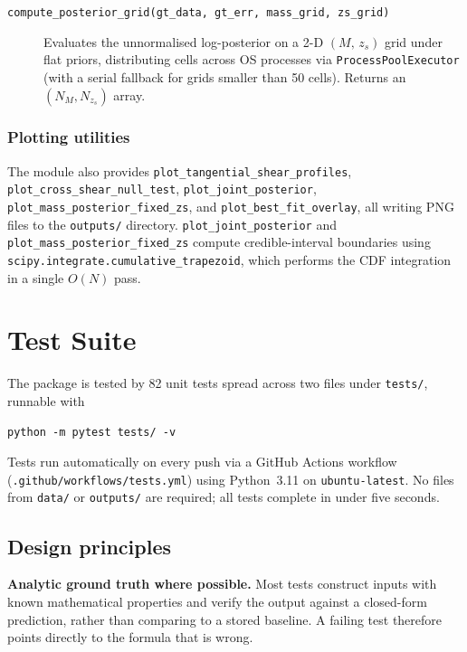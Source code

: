 \begin{description}
  \item[\texttt{compute\_posterior\_grid(gt\_data, gt\_err, mass\_grid,
        zs\_grid)}]
    Evaluates the unnormalised log-posterior on a 2-D $(M,\,z_s)$ grid under
    flat priors, distributing cells across OS processes via
    \texttt{ProcessPoolExecutor} (with a serial fallback for grids smaller than
    50 cells). Returns an $(N_M, N_{z_s})$ array.
\end{description}

\subsubsection*{Plotting utilities}

The module also provides \texttt{plot\_tangential\_shear\_profiles},
\texttt{plot\_cross\_shear\_null\_test}, \texttt{plot\_joint\_posterior},
\texttt{plot\_mass\_posterior\_fixed\_zs}, and \texttt{plot\_best\_fit\_overlay},
all writing PNG files to the \texttt{outputs/} directory.
\texttt{plot\_joint\_posterior} and \texttt{plot\_mass\_posterior\_fixed\_zs}
compute credible-interval boundaries using
\texttt{scipy.integrate.cumulative\_trapezoid}, which performs the CDF
integration in a single $O(N)$ pass.

\section{Test Suite}
\label{app:tests}

The package is tested by 82 unit tests spread across two files under
\texttt{tests/}, runnable with
\begin{verbatim}
python -m pytest tests/ -v
\end{verbatim}
Tests run automatically on every push via a GitHub Actions workflow
(\texttt{.github/workflows/tests.yml}) using Python~3.11 on
\texttt{ubuntu-latest}. No files from \texttt{data/} or \texttt{outputs/} are
required; all tests complete in under five seconds.

\subsection*{Design principles}

\textbf{Analytic ground truth where possible.} Most tests construct inputs with
known mathematical properties and verify the output against a closed-form
prediction, rather than comparing to a stored baseline. A failing test
therefore points directly to the formula that is wrong.

